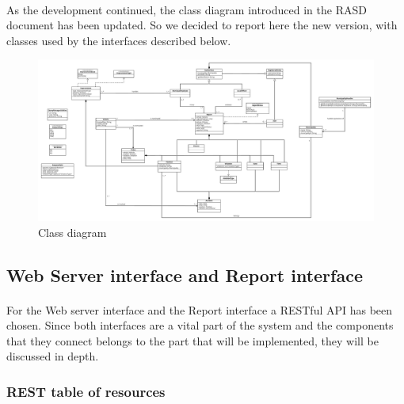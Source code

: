 			\paragraph{}
				As the development continued, the class diagram introduced in the RASD document has been updated. So we decided to  report here the new version, with classes used by the interfaces described below.
				\begin{figure}[!h]
					\centering
					\includegraphics[width=\textwidth]{images/DD2/classDiagram.pdf}
					\caption{Class diagram}
				\end{figure}
			\newpage
			\subsection{Web Server interface and Report interface}
				\paragraph{}
					For the Web server interface and the Report interface a RESTful API has been chosen. Since both interfaces are a vital part of the system and the components that they connect belongs to the part that will be implemented, they will be discussed in depth.
				\subsubsection{REST table of resources}
